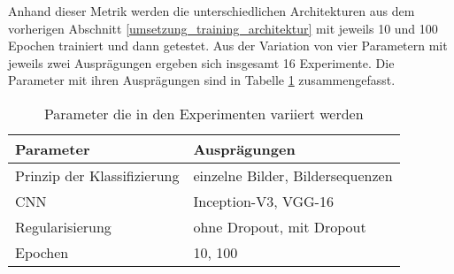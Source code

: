 Anhand dieser Metrik werden die unterschiedlichen Architekturen aus dem vorherigen Abschnitt \ref{umsetzung_training_architektur} mit jeweils 10 und 100 Epochen trainiert und dann getestet. Aus der Variation von vier Parametern mit jeweils zwei Ausprägungen ergeben sich insgesamt 16 Experimente. Die Parameter mit ihren Ausprägungen sind in Tabelle \ref{tab_parameter} zusammengefasst.

\begin{table}[h]
\small
\centering
\def\arraystretch{1.4}
\begin{tabular}{l l}
\textbf{Parameter} & \textbf{Ausprägungen} \\
\hline
Prinzip der Klassifizierung & einzelne Bilder, Bildersequenzen \\
\acl{CNN} & Inception-V3, VGG-16 \\
Regularisierung & ohne Dropout, mit Dropout \\
Epochen & 10, 100 \\
\hline
\end{tabular}
\caption{Parameter die in den Experimenten variiert werden}
\label{tab_parameter}
\end{table}













 


 
 

